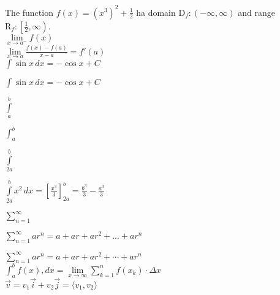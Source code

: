 \documentclass[12pt,a4paper]{article}
\begin{document}
The function $f(x)= (x^3)^2+\frac{1}{2}$ ha domain $\mathrm{D}_f:(-\infty,\infty)$ and range $\mathrm{R}_f:\left[\frac{1}{2},\infty\right)$.\\

$\lim \limits_{x \to a^-} f(x)$\\

$\displaystyle{\lim \limits_{x \to a}\frac{f(x)-f(a)}{x-a}=f'(a)}$\\

$\int \sin x\, dx = -\cos x + C$

$\displaystyle{\int \sin x\, dx = -\cos x + C}$

$\displaystyle{\int \limits_a^b}$

$\displaystyle{\int_a^b}$

$\displaystyle{\int \limits_{2a}^b}$

$\displaystyle{\int \limits_{2a}^{b}x^2\,dx=\left[\frac{x^3}{3}\right]_{2a}^{b}=\frac{b^3}{3}-\frac{a^3}{3}}$

$\displaystyle{\sum \limits_{n=1}^{\infty}}$

$\displaystyle{\sum \limits_{n=1}^{\infty}ar^n=a+ar+ar^2+...+ar^n}$

$\displaystyle{\sum \limits_{n=1}^{\infty}ar^n=a+ar+ar^2+ \cdots+ar^n}$\\

$\displaystyle{\int_a^b f(x),dx=\lim \limits_{x \to \infty}\sum \limits_{k=1}^{n}f(x_k) \cdot\Delta x}$\\

$\vec{v}=v_1 \vec{i}+v_2 \vec{j}=\langle v_1, v_2 \rangle$
\end{document}
